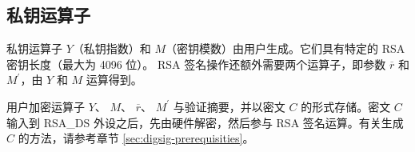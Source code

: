 \documentclass[main\_\_CN.tex]{subfiles}
\begin{document}
\subsection{私钥运算子}
\label{sec:digsig-private-key-operands}

私钥运算子 \begin{math}Y\end{math}（私钥指数）和 \begin{math}M\end{math}（密钥模数）由用户生成。它们具有特定的 RSA 密钥长度（最大为 4096 位）。
RSA 签名操作还额外需要两个运算子，即参数 \begin{math}\overline{r}\end{math} 和 \begin{math}M^{\prime}\end{math}，由 \begin{math}Y\end{math} 和 \begin{math}M\end{math} 运算得到。


用户加密运算子 \begin{math}Y\end{math}、
\begin{math}M\end{math}、
\begin{math}\overline{r}\end{math}、
\begin{math}M^{\prime}\end{math} 与验证摘要，并以密文 \begin{math}C\end{math} 的形式存储。密文 \begin{math}C\end{math} 输入到 RSA\_DS 外设之后，先由硬件解密，然后参与 RSA 签名运算。有关生成 \begin{math}C\end{math} 的方法，请参考章节 \ref{sec:digsig-prerequisities}。
\end{document}
